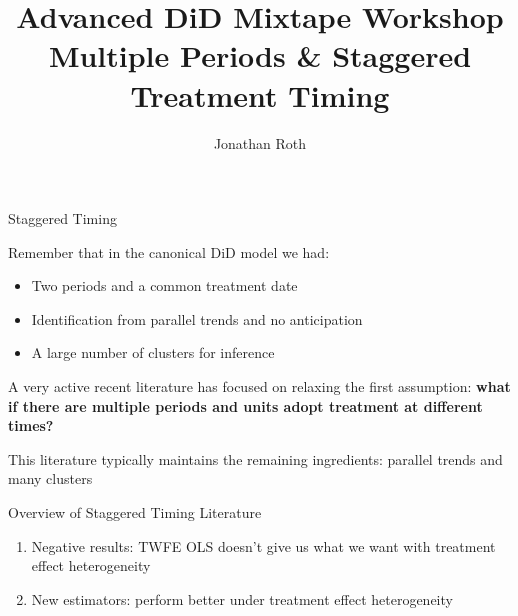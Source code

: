 \documentclass[usenames, dvipsnames, aspectratio = 169, 13pt]{beamer}
\author{Jonathan Roth}
\title[Advanced DiD Mixtape Workshop]{Advanced DiD Mixtape Workshop \\ Multiple Periods \& Staggered Treatment Timing}
\newenvironment{wideitemize}{\itemize\addtolength{\itemsep}{10pt}}{\enditemize}
\begin{document}
\maketitle

\begin{frame}{Staggered Timing}
\begin{wideitemize}
    \item
    Remember that in the canonical DiD model we had:
    
    \begin{itemize}
        \item 
        Two periods and a common treatment date
        
        \item
        Identification from parallel trends and no anticipation
        
        \item
        A large number of clusters for inference
    \end{itemize}
    
    \item
    A very active recent literature has focused on relaxing the first assumption: \textbf{what if there are multiple periods and units adopt treatment at different times?}
    
    \item
    This literature typically maintains the remaining ingredients: parallel trends and many clusters
    
\end{wideitemize}

\end{frame}


\begin{frame}{Overview of Staggered Timing Literature}

\begin{enumerate}
            \item
            Negative results: TWFE OLS doesn't give us what we want with treatment effect heterogeneity
            
            \item
            New estimators: perform better under treatment effect heterogeneity
        \end{enumerate}

    
\end{frame}
\end{document}
